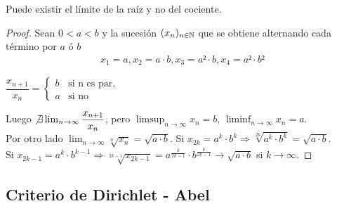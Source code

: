 \begin{eg}
  Puede existir el límite de la raíz y no del cociente.
  \begin{proof}
    Sean $0 < a < b$ y la sucesión $(x_n)_{n \in \mathbb{N}}$ que se obtiene alternando cada término por $a$ ó $b$ \begin{align*}
      x_1 = a, x_2 = a \cdot b, x_3 = a² \cdot b, x_4 = a² \cdot b²
    \end{align*}

    $\dfrac{x_{n+1}}{x_n} = \begin{cases}
        b & \text{si n es par}, \\
        a & \text{si no}
      \end{cases}$

    Luego $\not \exists \lim_{n \to \infty} \dfrac{x_{n+1}}{x_n}$, pero $\limsup_{n \to \infty} x_n = b$, $\liminf_{n \to \infty} x_n = a$. \\
    Por otro lado $\lim_{n \to \infty} \sqrt[n]{x_n} = \sqrt{a \cdot b}$. Si $x_{2k} = a^k \cdot b^k \Rightarrow \sqrt[2k]{a^k \cdot b^k} = \sqrt{a \cdot b}$. \\
    Si $x_{2k-1} = a^k \cdot b^{k-1} \Rightarrow \sqrt[2k-1]{x_{2k-1}} = a^{\frac{k}{2k-1}} \cdot b^{\frac{k}{2k-1}} \to \sqrt{a \cdot b}$ si $k \to \infty$.
  \end{proof}
\end{eg}

\subsection{Criterio de Dirichlet - Abel}

